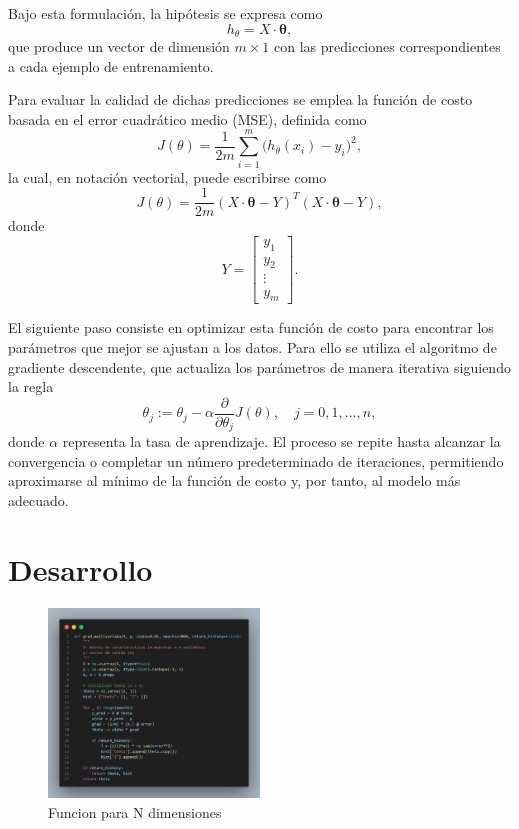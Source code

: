 \documentclass{iopjournal}
\begin{document}
Bajo esta formulación, la hipótesis se expresa como
\[
h_\theta = X \cdot \boldsymbol{\theta},
\]
que produce un vector de dimensión $m \times 1$ con las predicciones correspondientes a cada ejemplo de entrenamiento.  

Para evaluar la calidad de dichas predicciones se emplea la función de costo basada en el error cuadrático medio (MSE), definida como
\[
J(\theta) = \frac{1}{2m} \sum_{i=1}^{m} \big(h_\theta(x_i) - y_i\big)^2,
\]
la cual, en notación vectorial, puede escribirse como
\[
J(\theta) = \frac{1}{2m} (X \cdot \boldsymbol{\theta} - Y)^T (X \cdot \boldsymbol{\theta} - Y),
\]
donde
\[
Y = 
\begin{bmatrix}
y_1 \\
y_2 \\
\vdots \\
y_m
\end{bmatrix}.
\]

El siguiente paso consiste en optimizar esta función de costo para encontrar los parámetros que mejor se ajustan a los datos. Para ello se utiliza el algoritmo de gradiente descendente, que actualiza los parámetros de manera iterativa siguiendo la regla
\[
\theta_j := \theta_j - \alpha \frac{\partial}{\partial \theta_j} J(\theta), \quad j = 0, 1, \dots, n,
\]
donde $\alpha$ representa la tasa de aprendizaje. El proceso se repite hasta alcanzar la convergencia o completar un número predeterminado de iteraciones, permitiendo aproximarse al mínimo de la función de costo y, por tanto, al modelo más adecuado.


\section{Desarrollo}
\begin{figure}[H]
 \centering
        \includegraphics[width=0.5\textwidth]{rsc/funcion_n.png}
 \caption{Funcion para N dimensiones}
\label{fig1}
\end{figure}
\end{document}
